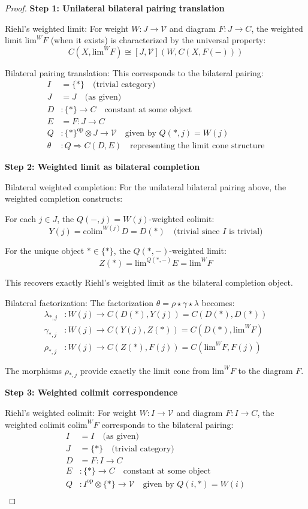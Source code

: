 \documentclass[11pt]{article}
\theoremstyle{plain}
\theoremstyle{definition}
\theoremstyle{remark}
\newcommand{\V}{\mathcal{V}}
\newcommand{\op}{\mathrm{op}}
\newcommand{\colim}{\mathrm{colim}}
\renewcommand{\lim}{\mathrm{lim}}
\begin{document}
\begin{proof}
\textbf{Step 1: Unilateral bilateral pairing translation}

Riehl's weighted limit: For weight $W : J \to \V$ and diagram $F : J \to C$, the weighted limit $\lim^W F$ (when it exists) is characterized by the universal property:
$$C(X, \lim^W F) \cong [J, \V](W, C(X, F(-)))$$

Bilateral pairing translation: This corresponds to the bilateral pairing:
\begin{align}
I &= \{*\} \quad \text{(trivial category)} \\
J &= J \quad \text{(as given)} \\
D &: \{*\} \to C \quad \text{constant at some object} \\
E &= F : J \to C \\
Q &: \{*\}^{\op} \otimes J \to \V \quad \text{given by } Q(*, j) = W(j) \\
\theta &: Q \Rightarrow C(D, E) \quad \text{representing the limit cone structure}
\end{align}

\textbf{Step 2: Weighted limit as bilateral completion}

Bilateral weighted completion: For the unilateral bilateral pairing above, the weighted completion constructs:

For each $j \in J$, the $Q(-, j) = W(j)$-weighted colimit:
$$Y(j) = \colim^{W(j)} D = D(*) \quad \text{(trivial since } I \text{ is trivial)}$$

For the unique object $* \in \{*\}$, the $Q(*, -)$-weighted limit:
$$Z(*) = \lim^{Q(*, -)} E = \lim^W F$$

This recovers exactly Riehl's weighted limit as the bilateral completion object.

Bilateral factorization: The factorization $\theta = \rho \star \gamma \star \lambda$ becomes:
\begin{align}
\lambda_{*,j} &: W(j) \to C(D(*), Y(j)) = C(D(*), D(*)) \\
\gamma_{*,j} &: W(j) \to C(Y(j), Z(*)) = C(D(*), \lim^W F) \\
\rho_{*,j} &: W(j) \to C(Z(*), F(j)) = C(\lim^W F, F(j))
\end{align}

The morphisms $\rho_{*,j}$ provide exactly the limit cone from $\lim^W F$ to the diagram $F$.

\textbf{Step 3: Weighted colimit correspondence}

Riehl's weighted colimit: For weight $W : I \to \V$ and diagram $F : I \to C$, the weighted colimit $\colim^W F$ corresponds to the bilateral pairing:
\begin{align}
I &= I \quad \text{(as given)} \\
J &= \{*\} \quad \text{(trivial category)} \\
D &= F : I \to C \\
E &: \{*\} \to C \quad \text{constant at some object} \\
Q &: I^{\op} \otimes \{*\} \to \V \quad \text{given by } Q(i, *) = W(i) \\
\end{align}


\end{proof}
\end{document}
